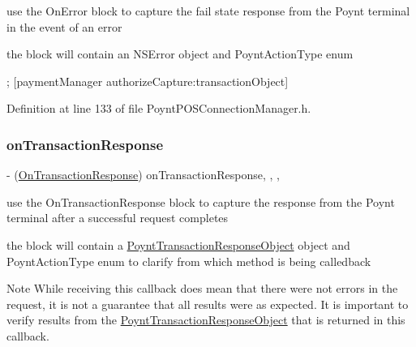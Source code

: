 use the On\+Error block to capture the fail state response from the Poynt terminal in the event of an error 

the block will contain an N\+S\+Error object and {\ttfamily Poynt\+Action\+Type} enum


\begin{DoxyCode}
;
[paymentManager authorizeCapture:transactionObject]
\end{DoxyCode}
 

Definition at line 133 of file Poynt\+P\+O\+S\+Connection\+Manager.\+h.

\hypertarget{interface_poynt_p_o_s_connection_manager_aec722c6cb0f961265852a406242c430b}{}\label{interface_poynt_p_o_s_connection_manager_aec722c6cb0f961265852a406242c430b} 
\subsubsection{\texorpdfstring{on\+Transaction\+Response}{onTransactionResponse}}
{\footnotesize\ttfamily -\/ (\hyperlink{_poynt_p_o_s_connection_manager_8h_ae268209596a83d1d61f8ce4f2513d800}{On\+Transaction\+Response}) on\+Transaction\+Response\hspace{0.3cm}{\ttfamily [read]}, {\ttfamily [write]}, {\ttfamily [atomic]}, {\ttfamily [copy]}}



use the On\+Transaction\+Response block to capture the response from the Poynt terminal after a successful request completes 

the block will contain a \hyperlink{interface_poynt_transaction_response_object}{Poynt\+Transaction\+Response\+Object} object and Poynt\+Action\+Type enum to clarify from which method is being calledback

\begin{DoxyNote}{Note}
While receiving this callback does mean that there were not errors in the request, it is not a guarantee that all results were as expected. It is important to verify results from the {\ttfamily \hyperlink{interface_poynt_transaction_response_object}{Poynt\+Transaction\+Response\+Object}} that is returned in this callback.
\end{DoxyNote}


